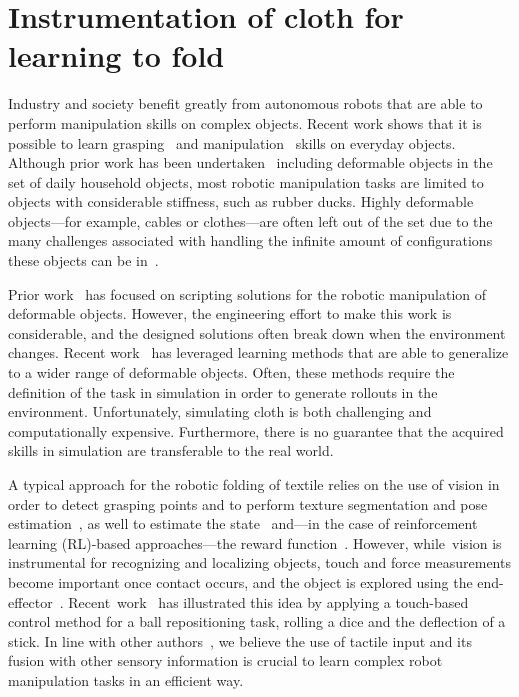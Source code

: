 \documentclass[\home/main.tex]{subfiles}
\begin{document}
\chapter{Instrumentation of cloth for learning to fold}\label{ch:instrumentation}

Industry and society benefit greatly from autonomous robots that are able to perform manipulation skills on complex objects. Recent work shows that it is possible to learn grasping~\cite{Levine2018, Morrison2018} and manipulation~\cite{Agrawal2016, Gu2017} skills on everyday objects. Although prior work has been undertaken~\cite{Levine2018} including deformable objects in the set of daily household objects, most robotic manipulation tasks are limited to objects with considerable stiffness, such as rubber ducks. Highly deformable objects---for example, cables or clothes---are often left out of the set due to the many challenges associated with handling the infinite amount of configurations these objects can be in~\cite{Foresti2004}.

Prior work~\cite{Saha2007, Maitin2010, Doumanoglou2016} has focused on scripting solutions for the robotic manipulation of deformable objects. However, the engineering effort to make this work is considerable, and the designed solutions often break down when the environment changes. Recent work~\cite{Matas2018, Seita2018} has leveraged learning methods that are able to generalize to a wider range of deformable objects. Often, these methods require the definition of the task in simulation in order to generate rollouts in the environment. Unfortunately, simulating cloth is both challenging and computationally expensive. Furthermore, there is no guarantee that the acquired skills in simulation are transferable to the real world. \par

A typical approach for the robotic folding of textile relies on the use of vision in order to detect grasping points and to perform texture segmentation and pose estimation~\cite{Maitin2010, Doumanoglou2016, Bersch2011}, as well to estimate the state~\cite{Matas2018} and---in the case of reinforcement learning (RL)-based approaches---the reward function~\cite{Tsurumine2019}. However, while~vision is instrumental for recognizing and localizing objects, touch and force measurements become important once contact occurs, and the object is explored using the end-effector~\cite{Billard2019}. Recent~work~\cite{Tian2019} has illustrated this idea by applying a touch-based control method for a ball repositioning task, rolling a dice and the deflection of a stick. In line with other authors~\cite{Tian2019, Lee2019}, we believe the use of tactile input and its fusion with other sensory information is crucial to learn complex robot manipulation tasks in an efficient way. \par
\end{document}
